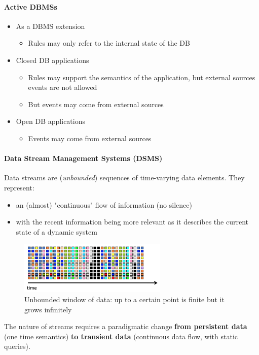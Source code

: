 \documentclass[10pt,a4paper]{article}
\begin{document}
\paragraph{Active DBMSs}
\begin{itemize}
	\item As a DBMS extension
	\begin{itemize}
		\item Rules may only refer to the internal state of the DB
	\end{itemize}
	\item Closed DB applications
	\begin{itemize}
		\item Rules may support the semantics of the application, but external sources events are not allowed
		\item But events may come from external sources
	\end{itemize}
	\item Open DB applications
	\begin{itemize}
		\item Events may come from external sources
	\end{itemize}
\end{itemize}

\paragraph{Data Stream Management Systems (DSMS)} 
Data streams are (\textit{unbounded}) sequences of time-varying data elements. They represent:
\begin{itemize}
	\item an (almost) "continuous" flow of information (no silence)
	\item with the recent information being more relevant as it describes the current state of a dynamic system
\end{itemize}

\begin{figure}[ht!]
 \hfill \includegraphics[width=200pt]{images/data-flow.png}\hspace*{\fill}
 \caption{Unbounded window of data: up to a certain point is finite but it grows infinitely}
\end{figure} 
The nature of streams requires a paradigmatic change \textbf{from persistent data} (one time semantics) \textbf{to transient data} (continuous data flow, with static queries).
\end{document}
